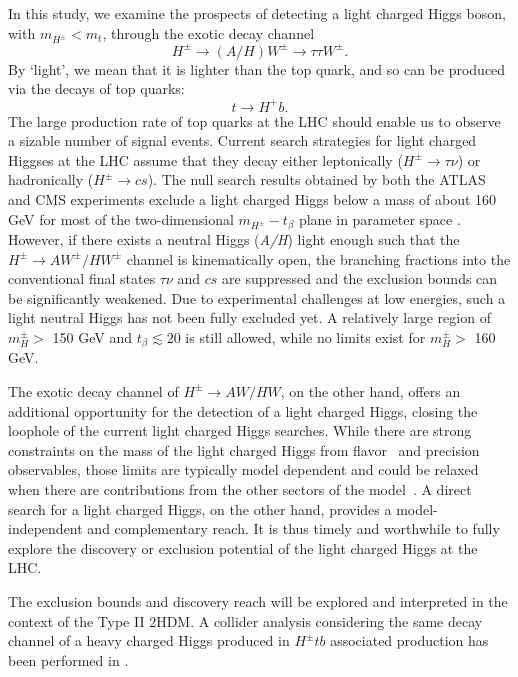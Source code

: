 In this study, we examine the prospects of detecting a light charged Higgs boson, with $m_{H^\pm}<m_t$, through the exotic decay channel
\[H^\pm\rightarrow (A/H)W^\pm\rightarrow \tau\tau W^\pm.\]
By `light', we mean that it is lighter than the top quark, and so can be produced via the decays of top quarks:
\[t\rightarrow H^+b.\]
The large production rate of top quarks at the LHC should enable us to observe a sizable number of signal events. Current search strategies for light charged Higgses at the LHC assume that they decay either leptonically ($H^{\pm} \rightarrow \tau\nu$) or hadronically ($H^{\pm} \rightarrow cs$). The null search results obtained by both the ATLAS and CMS experiments exclude a light charged Higgs below a mass of about 160 GeV for most of the two-dimensional $m_{H^\pm}-t_{\beta}$ plane in parameter space \cite{TheATLAScollaboration:2013wia,CMS:2014cdp}. However, if there exists a neutral Higgs (\emph{A/H}) light enough such that the $H^{\pm} \rightarrow AW^{\pm}/HW^{\pm}$ channel is kinematically open, the branching fractions into the conventional final states $\tau\nu$ and $cs$ are suppressed and the exclusion bounds can be significantly weakened. Due to experimental challenges at low energies, such a light neutral Higgs has not been fully excluded yet. A relatively large region of $m_H^\pm > $ 150 GeV and $t_\beta \lesssim 20$ is still allowed, while no limits exist for $m_H^\pm > $ 160 GeV.

The exotic decay channel of $H^\pm \to AW/HW$, on the other hand,  offers an additional opportunity for the detection of a light charged Higgs, closing the loophole of the current light charged Higgs searches.  While there are strong constraints on the mass of the light charged Higgs from flavor~\cite{Mahmoudi:2009zx,Coleppa:2013dya} and precision~\cite{Frogatt:1991qw,Frogatt:1992wt,Pomarol:1993mu,WahabElKafas:2007xd,Haber:2010bw} observables, those limits are typically model dependent and could be relaxed when there are contributions from the other sectors of the model~\cite{Han:2013mga}. A direct search for a light charged Higgs, on the other hand,  provides a model-independent and complementary reach. It is thus timely and worthwhile to fully explore the discovery or exclusion potential of the light charged Higgs at the LHC.

The exclusion bounds and discovery reach will be explored and interpreted in the context of the Type II $2$HDM. A collider analysis considering the same decay channel of a heavy charged Higgs produced in $H^{\pm} tb$ associated production has been performed in \cite{Coleppa:2014cca}. 

